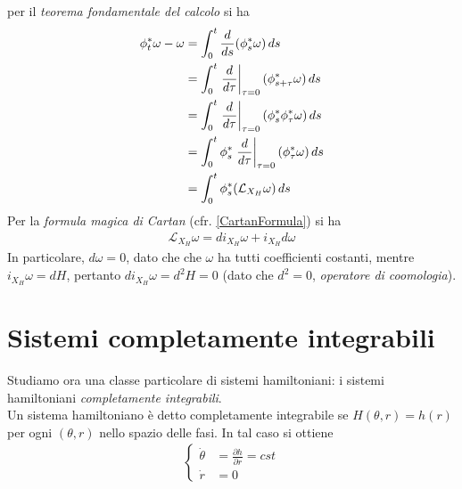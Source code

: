\documentclass[twoside, 11pt]{amsbook}
\makeatletter
\newcommand{\0}{{(0)}}
\newcommand{\3}{{(3)}}
\theoremstyle{colonplain}
\theoremstyle{colondefinition}
\theoremstyle{colonremark}
\numberwithin{equation}{chapter}
\renewcommand{\proofname}{Dimostrazione}
\renewenvironment{proof}[1][\proofname]{\par
  \pushQED{\qed}%
  \normalfont \topsep6\p@\@plus6\p@\relax
  \trivlist
  \item[\hskip\labelsep\bfseries #1:]\ignorespaces
}{%
  \popQED\endtrivlist\@endpefalse
}
\makeatother
\begin{document}
\begin{proof} per il \textit{teorema fondamentale del calcolo} si ha
\begin{align}
    \phi^*_t\omega - \omega &= \int_0^t \frac{d}{ds}(\phi^*_s\omega) \, ds \notag \\
    &= \int_0^t \left.\frac{d}{d\tau}\right|_{\tau = 0}(\phi^*_{s + \tau}\omega) \, ds \notag \\
    &= \int_0^t \left.\frac{d}{d\tau}\right|_{\tau = 0}(\phi^*_s\phi^*_\tau \omega) \, ds \notag \\
    &= \int_0^t \phi^*_s\left.\frac{d}{d\tau}\right|_{\tau = 0}(\phi^*_\tau \omega) \, ds \notag \\
    &= \int_0^t \phi^*_s(\mathcal{L}_{X_H}\omega) \, ds
\end{align}
Per la \textit{formula magica di Cartan} (cfr. \cref{CartanFormula}) si ha
\begin{align}
    \mathcal{L}_{X_H}\omega = di_{X_H}\omega + i_{X_H}d\omega
\end{align}
In particolare, $d\omega = 0$, dato che che $\omega$ ha tutti coefficienti costanti, mentre $i_{X_H}\omega = dH$, pertanto $di_{X_H}\omega = d^2H = 0$ (dato che $d^2 = 0$, \textit{operatore di coomologia}). 
\end{proof}

\chapter{Sistemi completamente integrabili}
Studiamo ora una classe particolare di sistemi hamiltoniani: i sistemi hamiltoniani \textit{completamente integrabili}. \\
Un sistema hamiltoniano è detto completamente integrabile se $H(\theta, r) = h(r)$ per ogni $(\theta, r)$ nello spazio delle fasi. In tal caso si ottiene 
\begin{align}
    \begin{cases}
        \dot{\theta} &= \frac{\partial h}{\partial r} = cst \\
        \dot{r} &= 0
    \end{cases} 
\end{align}
\end{document}
